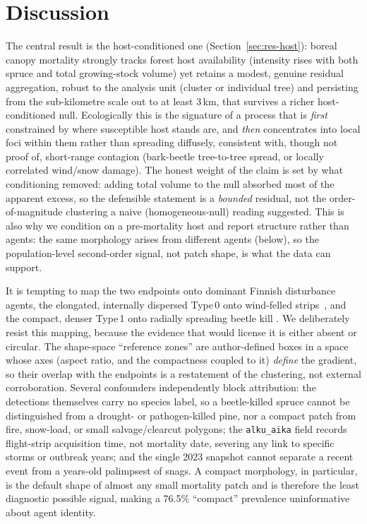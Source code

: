 \documentclass[twocolumn]{article}
\begin{document}
\section{Discussion}
\label{sec:discussion}

The central result is the host-conditioned one (Section~\ref{sec:res-host}): boreal canopy mortality
strongly tracks forest host availability (intensity rises with both spruce and total growing-stock
volume) yet retains a modest, genuine residual aggregation, robust to the analysis unit (cluster or
individual tree) and persisting from the sub-kilometre scale out to at least 3\,km, that survives
a richer host-conditioned null. Ecologically this is the signature of a process that is
\emph{first} constrained by where susceptible host stands are, and \emph{then} concentrates into
local foci within them rather than spreading diffusely, consistent with, though not proof of,
short-range contagion (bark-beetle tree-to-tree spread, or locally correlated wind/snow damage). The
honest weight of the claim is set by what conditioning removed: adding total volume to the null
absorbed most of the apparent excess, so the defensible statement is a \emph{bounded} residual, not
the order-of-magnitude clustering a naive (homogeneous-null) reading suggested.
This is also why we condition on a pre-mortality host and report structure rather than agents: the
same morphology arises from different agents (below), so the population-level second-order signal,
not patch shape, is what the data can support.

It is tempting to map the two endpoints onto dominant Finnish disturbance agents, the elongated,
internally dispersed Type\,0 onto wind-felled strips~\citep{gardiner2013wind, gregow2011combined},
and the compact, denser Type\,1 onto radially spreading beetle kill
\citep{raffa2008cross, jonsson2012epidemics, kautz2011simulating}. We deliberately resist this
mapping, because the evidence that would license it is either absent or circular. The shape-space
``reference zones'' are author-defined boxes in a space whose axes (aspect ratio, and the
compactness coupled to it) \emph{define} the gradient, so their overlap with the endpoints is a
restatement of the clustering, not external corroboration. Several confounders independently block
attribution: the detections themselves carry no species label, so a beetle-killed spruce cannot be
distinguished from a drought- or pathogen-killed pine, nor a compact patch from fire, snow-load,
or small salvage/clearcut polygons; the \texttt{alku\_aika} field records flight-strip
acquisition time, not mortality date, severing any link to specific storms or outbreak years; and
the single 2023 snapshot cannot separate a recent event from a years-old palimpsest of snags.
A compact morphology, in particular, is the default shape of almost any small mortality patch and
is therefore the least diagnostic possible signal, making a 76.5\% ``compact'' prevalence
uninformative about agent identity.
\end{document}
